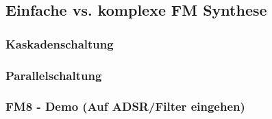 \subsection{Einfache vs. komplexe FM Synthese}

\subsubsection{Kaskadenschaltung}
\subsubsection{Parallelschaltung}
\subsubsection{FM8 - Demo (Auf ADSR/Filter eingehen)}
